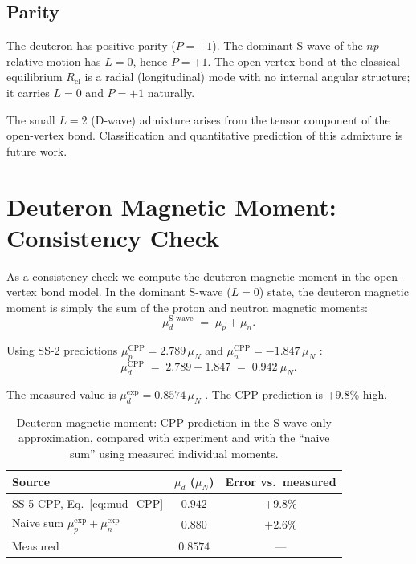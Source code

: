 \documentclass[11pt,letterpaper]{article}
\begin{document}
\subsection{Parity}

The deuteron has positive parity ($P = +1$). The dominant S-wave of the $np$ relative motion has $L = 0$, hence $P = +1$. The open-vertex bond at the classical equilibrium $R_{\mathrm{cl}}$ is a radial (longitudinal) mode with no internal angular structure; it carries $L = 0$ and $P = +1$ naturally.

The small $L = 2$ (D-wave) admixture arises from the tensor component of the open-vertex bond. Classification and quantitative prediction of this admixture is future work.

\section{Deuteron Magnetic Moment: Consistency Check}
\label{sec:magmom}

As a consistency check we compute the deuteron magnetic moment in the open-vertex bond model. In the dominant S-wave ($L = 0$) state, the deuteron magnetic moment is simply the sum of the proton and neutron magnetic moments:
\begin{equation}
\mu_d^{\mathrm{S\text{-}wave}} \;=\; \mu_p + \mu_n.
\label{eq:mud_Swave}
\end{equation}

Using SS-2 predictions $\mu_p^{\mathrm{CPP}} = 2.789\,\mu_N$ and $\mu_n^{\mathrm{CPP}} = -1.847\,\mu_N$ \citep{abshier2026ss2}:
\begin{equation}
\mu_d^{\mathrm{CPP}} \;=\; 2.789 - 1.847 \;=\; 0.942~\mu_N.
\label{eq:mud_CPP}
\end{equation}

The measured value is $\mu_d^{\mathrm{exp}} = 0.8574\,\mu_N$ \citep{pdg2024}. The CPP prediction is $+9.8\%$ high.

\begin{table}[H]
\centering
\caption{Deuteron magnetic moment: CPP prediction in the S-wave-only approximation, compared with experiment and with the ``naive sum'' using measured individual moments.}
\label{tab:mud}
\begin{tabular}{@{}lcc@{}}
\toprule
Source & $\mu_d$ ($\mu_N$) & Error vs.\ measured \\
\midrule
SS-5 CPP, Eq.~\eqref{eq:mud_CPP} & $0.942$ & $+9.8\%$ \\
Naive sum $\mu_p^{\mathrm{exp}} + \mu_n^{\mathrm{exp}}$ & $0.880$ & $+2.6\%$ \\
Measured \citep{pdg2024} & $0.8574$ & --- \\
\bottomrule
\end{tabular}
\end{table}
\end{document}
